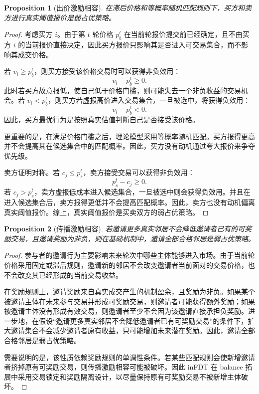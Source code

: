 \documentclass[UTF8,a4paper,12pt]{ctexart}
\newtheorem{proposition}{Proposition}
\begin{document}
\begin{proposition}[出价激励相容]
    在滞后价格和等概率随机匹配规则下，买方和卖方进行真实阈值报价是弱占优策略。
\end{proposition}

\begin{proof}
    考虑买方 \(i\)。由于第 \(t\) 轮价格 \(p_b^t\) 在当前轮报价提交前已经确定，且不由买方 \(i\) 的当前报价直接决定，因此买方报价只影响其是否进入可交易集合，而不影响其成交价格。

    若 \(v_i\ge p_b^t\)，则买方接受该价格交易时可以获得非负效用：
    \[
        v_i-p_b^t\ge 0.
    \]
    此时若买方故意报低，使自己低于价格门槛，则可能失去一个非负收益的交易机会。若 \(v_i<p_b^t\)，则买方若虚报高价进入交易集合，一旦被选中，将获得负效用：
    \[
        v_i-p_b^t<0.
    \]
    因此，买方最优行为是按照真实估值判断自己是否接受该价格。

    更重要的是，在满足价格门槛之后，理论模型采用等概率随机匹配。买方报得更高并不会提高其在候选集合中的匹配概率。因此，买方没有动机通过夸大报价来争夺优先级。

    卖方证明对称。若 \(c_j\le p_s^t\)，卖方接受交易可以获得非负效用：
    \[
        p_s^t-c_j\ge 0.
    \]
    若 \(c_j>p_s^t\)，卖方虚报低成本进入候选集合，一旦被选中则会获得负效用。并且在进入候选集合后，卖方报得更低并不会提高匹配概率。因此，卖方也没有动机偏离真实阈值报价。综上，真实阈值报价是买卖双方的弱占优策略。
\end{proof}

\begin{proposition}[传播激励相容]
    若邀请更多真实邻居不会降低邀请者已有的可奖励交易，且邀请奖励为非负，则在基础机制中，邀请全部合格邻居是弱占优策略。
\end{proposition}

\begin{proof}
    参与者的邀请行为主要影响未来轮次中哪些主体能够进入市场。由于当前轮价格采用固定或滞后规则，邀请新的邻居不会改变邀请者当前面对的交易价格，也不会改变其已经形成的当前交易收益。

    在奖励规则上，邀请奖励来自真实成交产生的机制盈余，且奖励为非负。如果某个被邀请主体在未来参与交易并形成可奖励交易，则邀请者可能获得额外奖励；如果被邀请主体没有形成有效交易，则邀请者至少不会因为该邀请直接承担负奖励。进一步地，在假设“邀请更多真实邻居不会降低邀请者已有可奖励交易”的条件下，扩大邀请集合不会减少邀请者原有收益，只可能增加未来潜在奖励。因此，邀请全部合格邻居是弱占优策略。

    需要说明的是，该性质依赖奖励规则的单调性条件。若某些匹配规则会使新增邀请者挤掉原有可奖励交易，则传播激励相容可能被破坏。因此 inFDT 在 balance 拓展中采用交易锁定和奖励隔离设计，以尽量保持原有可奖励交易不被新增主体破坏。
\end{proof}
\end{document}
